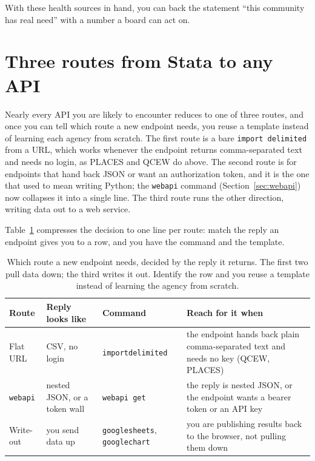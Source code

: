 With these health sources in hand, you can back the statement \enquote{this community has real need} with a number a board can act on.

\section{Three routes from Stata to any API}\label{sec:threeroutes}
Nearly every API you are likely to encounter reduces to one of three routes, and once you can tell which route a new endpoint needs, you reuse a template instead of learning each agency from scratch. The first route is a bare \texttt{import delimited} from a URL, which works whenever the endpoint returns comma-separated text and needs no login, as PLACES and QCEW do above. The second route is for endpoints that hand back JSON or want an authorization token, and it is the one that used to mean writing Python; the \texttt{webapi} command (Section~\ref{sec:webapi}) now collapses it into a single line. The third route runs the other direction, writing data out to a web service.

Table~\ref{tab:ch03-viz-routes} compresses the decision to one line per route: match the reply an endpoint gives you to a row, and you have the command and the template.

\begin{table}[htbp]
\centering
\footnotesize
\begin{tabular}{@{}p{1.9cm}p{2.9cm}p{2.8cm}p{7.0cm}@{}}
\toprule
Route & Reply looks like & Command & Reach for it when \\
\midrule
Flat URL & CSV, no login & \texttt{import}\newline\texttt{delimited} & the endpoint hands back plain comma-separated text and needs no key (QCEW, PLACES) \\
\addlinespace
\texttt{webapi} & nested JSON, or a token wall & \texttt{webapi get} & the reply is nested JSON, or the endpoint wants a bearer token or an API key \\
\addlinespace
Write-out & you send data up & \texttt{googlesheets}, \texttt{googlechart} & you are publishing results back to the browser, not pulling them down \\
\bottomrule
\end{tabular}
\caption[Three routes from Stata to any API]{Which route a new endpoint needs, decided by the reply it returns. The first two pull data down; the third writes it out. Identify the row and you reuse a template instead of learning the agency from scratch.}
\label{tab:ch03-viz-routes}
\end{table}

